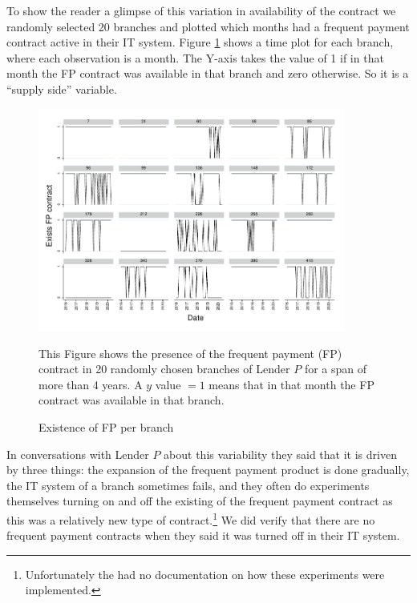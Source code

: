\documentclass[oneside,11pt]{article}
\begin{document}
To show the reader a glimpse of this variation in availability of the contract we randomly selected 20 branches and plotted which months had a frequent payment contract active in their IT system. Figure \ref{variation_pf_suc} shows a time plot for each branch, where each observation is a month. The Y-axis takes the value of 1 if in that month the FP contract was available in that branch and zero otherwise. So it is a ``supply side'' variable. 

\vspace{.1in}
\begin{figure}[H]
        \caption{Existence of FP per branch}
    \label{variation_pf_suc}
    \begin{center}
        \centering
        \includegraphics[width=0.9\textwidth]{Figuras/active_pf_suc.pdf}
    \end{center}
     \scriptsize This Figure shows the presence of the frequent payment (FP) contract in 20 randomly chosen branches of Lender $P$ for a span of more than 4 years. A $y$ value $=1$ means that in that month the FP contract was available in that branch. 
\end{figure}
\vspace{.1in}

In conversations with Lender $P$ about this variability they said that it is driven by three things: the expansion of the frequent payment product is done gradually, the IT system of a branch sometimes fails, and they often do experiments themselves turning on and off the existing of the frequent payment contract as this was a relatively new type of contract.\footnote{Unfortunately the had no documentation on how these experiments were implemented.} We did verify that there are no frequent payment contracts when they said it was turned off in their IT system.
\end{document}
